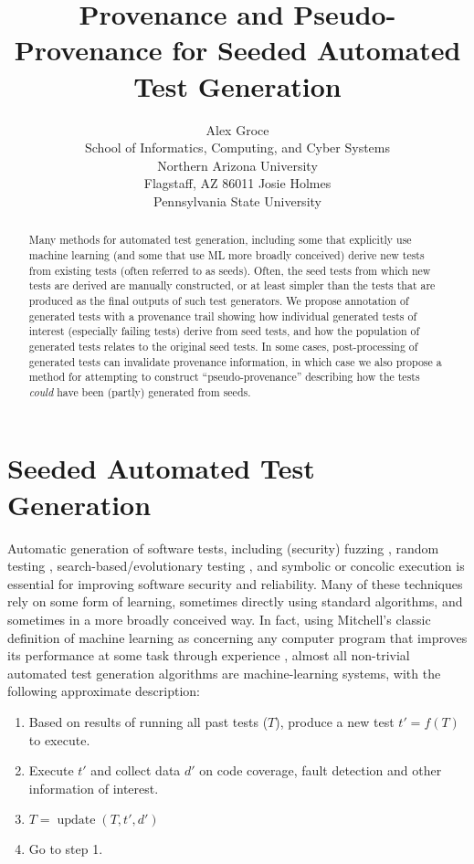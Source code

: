 \documentclass[final]{article}
\title{Provenance and Pseudo-Provenance for Seeded Automated Test Generation}
\author{
Alex Groce\\
School of Informatics, Computing, and Cyber Systems\\
Northern Arizona University\\
Flagstaff, AZ 86011
\And
Josie Holmes\\
Pennsylvania State University 
}
\DeclareMathOperator{\Update}{update}
\begin{document}

\maketitle

\begin{abstract}
  Many methods for automated test generation, including some that
  explicitly use machine learning (and some that use ML more broadly
  conceived) derive new tests from existing tests (often referred to
  as seeds).  Often, the seed tests
  from which new tests are derived are manually constructed, or at least
  simpler than the tests that are produced as the final outputs of
  such test generators.  We
  propose annotation of generated tests with a provenance trail showing
  how individual generated tests of interest (especially failing tests) derive
  from seed tests, and how the population of generated tests relates
  to the original seed tests.  In some cases, post-processing of
  generated tests can invalidate provenance information, in which case
  we also propose a method for attempting to construct
  ``pseudo-provenance'' describing how the tests \emph{could} have
  been (partly) generated from seeds.
\end{abstract}

\section{Seeded Automated Test Generation}

Automatic generation of software tests, including (security) fuzzing
\cite{aflfuzz,TrailBitsSeeded}, random testing \cite{csmith,ICSEDiff,Pacheco},
search-based/evolutionary testing \cite{FA11},
and symbolic or concolic execution
\cite{Whitebox,GodefroidKS05,KLEE,Person:2011:DIS:1993498.1993558,Marinescu:2012:MTS:2337223.2337308,issta14}
is essential for improving software security and reliability.  Many of
these techniques rely on some form of learning, sometimes directly
using standard algorithms, and sometimes in a more broadly conceived
way.  In fact, using Mitchell's classic definition of machine learning
as concerning any computer program that improves its performance at some
task through experience \cite{Mitchell}, almost all non-trivial automated test generation
algorithms are machine-learning systems, with the following
approximate description:

\begin{enumerate}
\item Based on results of running all past tests ($T$), produce a new test
  $t' = f(T)$ to execute.
\item Execute $t'$ and collect data $d'$ on code coverage, fault detection and other
  information of interest.
\item $T = \Update(T,t',d')$
\item Go to step 1.
\end{enumerate}
\end{document}

